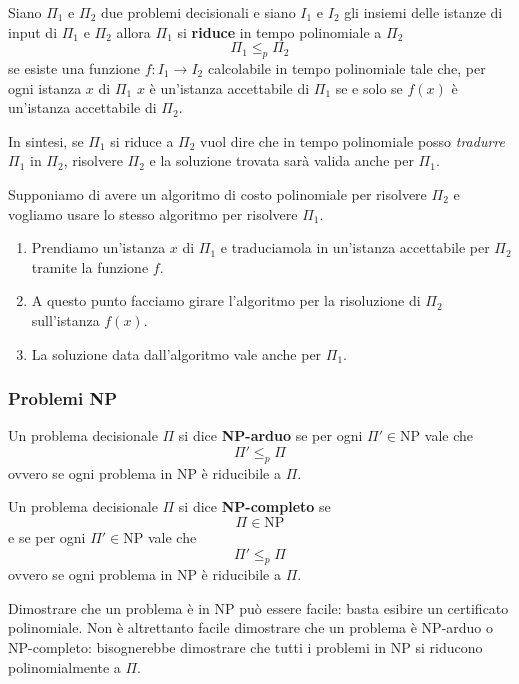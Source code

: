 \begin{theorem}
	Siano $\Pi_1$ e $\Pi_2$ due problemi decisionali e siano $I_1$ e $I_2$ gli insiemi delle istanze di input di
	$\Pi_1$ e $\Pi_2$ allora $\Pi_1$ si \textbf{riduce} in tempo polinomiale a $\Pi_2$
	\[ \Pi_1 \leq_p \Pi_2 \]
	se esiste una funzione $f : I_1 \rightarrow I_2$ calcolabile in tempo polinomiale tale che, per ogni istanza $x$ di
	$\Pi_1$ $x$ \`e un'istanza accettabile di $\Pi_1$ se e solo se $f(x)$ \`e un'istanza accettabile di $\Pi_2$.
\end{theorem}

In sintesi, se $\Pi_1$ si riduce a $\Pi_2$ vuol dire che in tempo polinomiale posso \emph{tradurre} $\Pi_1$ in $\Pi_2$,
risolvere $\Pi_2$ e la soluzione trovata sar\`a valida anche per $\Pi_1$.

Supponiamo di avere un algoritmo di costo polinomiale per risolvere $\Pi_2$ e vogliamo usare lo stesso algoritmo per
risolvere $\Pi_1$.
\begin{enumerate}
	\item Prendiamo un'istanza $x$ di $\Pi_1$ e traduciamola in un'istanza accettabile per $\Pi_2$ tramite la funzione
	      $f$.
	\item A questo punto facciamo girare l'algoritmo per la risoluzione di $\Pi_2$ sull'istanza $f(x)$.
	\item La soluzione data dall'algoritmo vale anche per $\Pi_1$.
\end{enumerate}

\subsubsection{Problemi NP}

\begin{definition}
	Un problema decisionale $\Pi$ si dice \textbf{NP-arduo} se per ogni $\Pi' \in \text{NP}$ vale che
	\[ \Pi' \leq_p \Pi \]
	ovvero se ogni problema in NP \`e riducibile a $\Pi$.
\end{definition}

\begin{definition}
	Un problema decisionale $\Pi$ si dice \textbf{NP-completo} se
	\[ \Pi \in \text{NP} \]
	e se per ogni $\Pi' \in \text{NP}$ vale che
	\[ \Pi' \leq_p \Pi \]
	ovvero se ogni problema in NP \`e riducibile a $\Pi$.
\end{definition}

Dimostrare che un problema \`e in NP pu\`o essere facile: basta esibire un certificato polinomiale. Non \`e altrettanto
facile dimostrare che un problema \`e NP-arduo o NP-completo: bisognerebbe dimostrare che tutti i problemi in NP si
riducono polinomialmente a $\Pi$.

